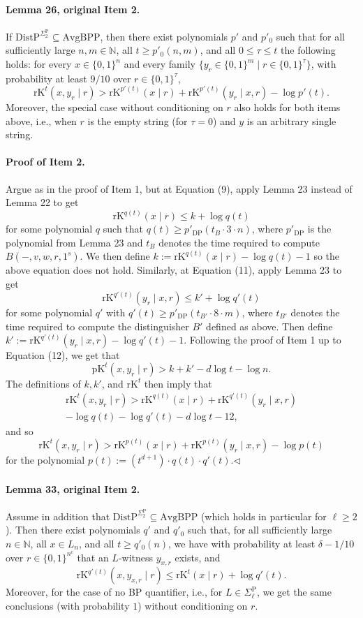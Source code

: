 \paragraph{Lemma 26, original Item 2.} If $\mathrm{DistP}^{\Sigma_2^{\mathrm P}}\subseteq\mathrm{AvgBPP}$, then there exist polynomials $p'$ and $p'_0$ such that for all sufficiently large $n,m\in\mathbb N$, all $t\geq p'_0(n,m)$, and all $0\leq\tau\leq t$ the following holds: for every $x\in\{0,1\}^n$ and every family $\{y_r\in\{0,1\}^m\mid r\in\{0,1\}^\tau\}$, with probability at least $9/10$ over $r\in\{0,1\}^\tau$,
\[\mathrm{rK}^t(x,y_r\mid r)>\mathrm{rK}^{p'(t)}(x\mid r)+\mathrm{rK}^{p'(t)}(y_r\mid x,r)-\log p'(t).\]
Moreover, the special case without conditioning on $r$ also holds for both items above, i.e., when $r$ is the empty string (for $\tau=0$) and $y$ is an arbitrary single string.
\paragraph{Proof of Item 2.} Argue as in the proof of Item 1, but at Equation (9), apply Lemma 23 instead of Lemma 22 to get
\[\mathrm{rK}^{q(t)}(x\mid r)\leq k+\log q(t)\]
for some polynomial $q$ such that $q(t)\geq p'_{\mathrm{DP}}(t_B\cdot3\cdot n)$, where $p'_{\mathrm{DP}}$ is the polynomial from Lemma 23 and $t_B$ denotes the time required to compute $B(-,v,w,r,1^s)$. We then define $k:=\mathrm{rK}^{q(t)}(x\mid r)-\log q(t)-1$ so the above equation does not hold. Similarly, at Equation (11), apply Lemma 23 to get
\[\mathrm{rK}^{q'(t)}(y_r\mid x,r)\leq k'+\log q'(t)\]
for some polynomial $q'$ with $q'(t)\geq p'_{\mathrm{DP}}(t_{B'}\cdot8\cdot m)$, where $t_{B'}$ denotes the time required to compute the distinguisher $B'$ defined as above. Then define $k':=\mathrm{rK}^{q'(t)}(y_r\mid x,r)-\log q'(t)-1$.
Following the proof of Item 1 up to Equation (12), we get that
\[\mathrm{pK}^t(x,y_r\mid r)>k+k'-d\log t-\log n.\]
The definitions of $k,k'$, and $\mathrm{rK}^t$ then imply that
\begin{multline*}
\mathrm{rK}^t(x,y_r\mid r)>\mathrm{rK}^{q(t)}(x\mid r)+\mathrm{rK}^{q'(t)}(y_r\mid x,r)\\
-\log q(t)-\log q'(t)-d\log t-12,
\end{multline*}
and so
\[\mathrm{rK}^t(x,y_r\mid r)>\mathrm{rK}^{p(t)}(x\mid r)+\mathrm{rK}^{p(t)}(y_r\mid x,r)-\log p(t)\]
for the polynomial $p(t):=(t^{d+1})\cdot q(t)\cdot q'(t)$.\hfill$\triangleleft$
\paragraph{Lemma 33, original Item 2.} Assume in addition that $\mathrm{DistP}^{\Sigma_2^{\mathrm P}}\subseteq\mathrm{AvgBPP}$ (which holds in particular for $\ell\geq2$). Then there exist polynomials $q'$ and $q'_0$ such that, for all sufficiently large $n\in\mathbb N$, all $x\in L_n$, and all $t\geq q'_0(n)$, we have with probability at least $\delta-1/10$ over $r\in\{0,1\}^{n^c}$ that an $L$-witness $y_{x,r}$ exists, and
\[\mathrm{rK}^{q'(t)}(x,y_{x,r}\mid r)\leq\mathrm{rK}^t(x\mid r)+\log q'(t).\]
Moreover, for the case of no BP quantifier, i.e., for $L\in\Sigma_\ell^{\mathrm P}$, we get the same conclusions (with probability $1$) without conditioning on $r$.
